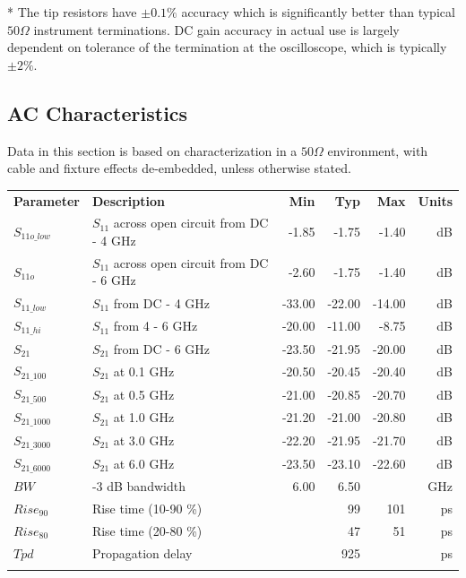 \documentclass[11pt]{article}
\newcommand{\thinhline}{\Xhline{1\arrayrulewidth}}
\newcommand{\thickhline}{\Xhline{2.5\arrayrulewidth}}
\begin{document}
* The tip resistors have $\pm 0.1\%$ accuracy which is significantly better than typical $50 \Omega$ instrument
terminations. DC gain accuracy in actual use is largely dependent on tolerance of the termination at the oscilloscope,
which is typically $\pm 2\%$.

\pagebreak
\subsection{AC Characteristics}

Data in this section is based on characterization in a $50 \Omega$ environment, with cable and fixture effects
de-embedded, unless otherwise stated.

\begin{tabularx}{16cm}{lXrrrr}
\thickhline
\textbf{Parameter} & \textbf{Description} & \textbf{Min} & \textbf{Typ} & \textbf{Max} & \textbf{Units} \\
\thickhline
$S_{11o\_low}$ & $S_{11}$ across open circuit from DC - 4 GHz & -1.85 & -1.75 & -1.40 & dB \\
\thinhline
$S_{11o}$ & $S_{11}$ across open circuit from DC - 6 GHz & -2.60 & -1.75 & -1.40 & dB \\
\thinhline
$S_{11\_low}$ & $S_{11}$ from DC - 4 GHz & -33.00 & -22.00 & -14.00 & dB \\
\thinhline
$S_{11\_hi}$ & $S_{11}$ from 4 - 6 GHz & -20.00 & -11.00 & -8.75 & dB \\
\thinhline
$S_{21}$ & $S_{21}$ from DC - 6 GHz & -23.50 & -21.95 & -20.00 & dB \\
\thinhline
$S_{21\_100}$ & $S_{21}$ at 0.1 GHz & -20.50 & -20.45 & -20.40 & dB \\
\thinhline
$S_{21\_500}$ & $S_{21}$ at 0.5 GHz & -21.00 & -20.85 & -20.70 & dB \\
\thinhline
$S_{21\_1000}$ & $S_{21}$ at 1.0 GHz & -21.20 & -21.00 & -20.80 & dB \\
\thinhline
$S_{21\_3000}$ & $S_{21}$ at 3.0 GHz & -22.20 & -21.95 & -21.70 & dB \\
\thinhline
$S_{21\_6000}$ & $S_{21}$ at 6.0 GHz & -23.50 & -23.10 & -22.60 & dB \\
\thinhline
$BW$ & -3 dB bandwidth & 6.00 & 6.50 & & GHz \\
\thinhline
$Rise_{90}$ & Rise time (10-90 \%) &  & 99 & 101 & ps \\
\thinhline
$Rise_{80}$ & Rise time (20-80 \%) &  & 47 & 51 & ps \\
\thinhline
$Tpd$ & Propagation delay &  & 925 &  & ps \\
\thickhline
\end{tabularx}
\end{document}
